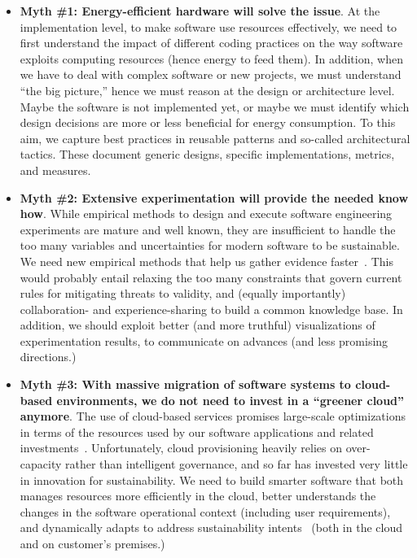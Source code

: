 \documentclass[11pt, oneside]{amsart}
\begin{document}
\begin{itemize}
\item[] {\bf Myth \#1: Energy-efficient hardware will solve the issue}. At the implementation level, to make software use resources effectively, we need to first understand the impact of different coding practices on the way software exploits computing resources (hence energy to feed them). In addition, when we have to deal with complex software or new projects, we must understand ``the big picture,'' hence we must reason at the design or architecture level. Maybe the software is not implemented yet, or maybe we must identify which design decisions are more or less beneficial for energy consumption. To this aim, we capture best practices in reusable patterns and so-called architectural tactics. These document generic designs, specific implementations, metrics, and measures.\\

\item[] {\bf Myth \#2: Extensive experimentation will provide the needed know how}. While empirical methods to design and execute software engineering experiments are mature and well known, they are insufficient to handle the too many variables and uncertainties for modern software to be sustainable. We need new empirical methods that help us gather evidence faster~\cite{Procaccianti2015}. This would probably entail relaxing the too many constraints that govern current rules for mitigating threats to validity, and (equally importantly) collaboration- and experience-sharing to build a common knowledge base. In addition, we should exploit better (and more truthful) visualizations of experimentation results, to communicate on advances (and less promising directions.)\\

\item[] {\bf Myth \#3: With massive migration of software systems to cloud-based environments, we do not need to invest in a ``greener cloud'' anymore}. The use of cloud-based services promises large-scale optimizations in terms of the resources used by our software applications and related investments~\cite{green-cloud-sw}. Unfortunately, cloud provisioning heavily relies on over-capacity rather than intelligent governance, and so far has invested very little in innovation for sustainability. We need to build smarter software that both manages resources more efficiently in the cloud, better understands the changes in the software operational context (including user requirements), and dynamically adapts to address sustainability intents~\cite{Procaccianti2016-2} (both in the cloud and on customer's premises.)\\

\end{itemize}
\end{document}
